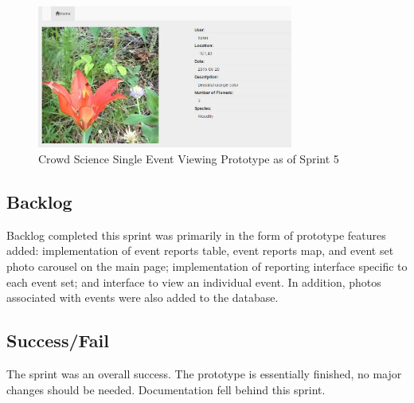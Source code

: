 \begin{figure}[tbh]
\begin{center}
\includegraphics[width=0.75\textwidth]{./figures/prototype_S5_view.png}
\end{center}
\caption{Crowd Science Single Event Viewing Prototype as of Sprint 5\label{prototype_S5_view}}
\end{figure}

\subsection{Backlog}
Backlog completed this sprint was primarily in the form of prototype features added: implementation of event reports table, event reports map, and event set photo carousel on the main page; implementation of reporting interface specific to each event set; and interface to view an individual event. In addition, photos associated with events were also added to the database.
\subsection{Success/Fail}
The sprint was an overall success.  The prototype is essentially finished, no major changes should be needed. Documentation fell behind this sprint.

